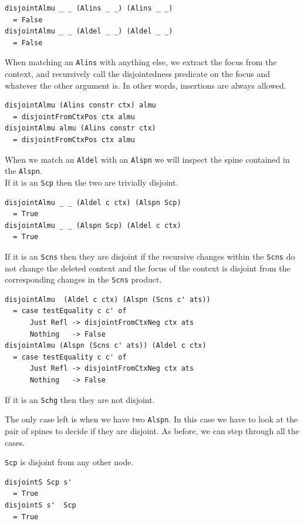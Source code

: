 \documentclass[11pt, titlepage]{article}
\newcommand{\toHaskell}[1]{\texttt{#1}\xspace}
\newcommand{\alins}{\toHaskell{Alins}}
\newcommand{\aldel}{\toHaskell{Aldel}}
\newcommand{\alspn}{\toHaskell{Alspn}}
\newcommand{\scp}{\toHaskell{Scp}}
\newcommand{\scns}{\toHaskell{Scns}}
\newcommand{\schg}{\toHaskell{Schg}}
\begin{document}
\begin{verbatim}
disjointAlmu _ _ (Alins _ _) (Alins _ _) 
  = False
disjointAlmu _ _ (Aldel _ _) (Aldel _ _)
  = False
\end{verbatim}

When matching an \alins with anything else, we extract the focus from the context, and recursively call the disjointedness predicate on the focus and whatever the other argument is. In other words, insertions are always allowed.

\begin{verbatim}
disjointAlmu (Alins constr ctx) almu
  = disjointFromCtxPos ctx almu
disjointAlmu almu (Alins constr ctx)
  = disjointFromCtxPos ctx almu
\end{verbatim}

When we match an \aldel with an \alspn we will inspect the spine contained in the \alspn.
\\
If it is an \scp then the two are trivially disjoint.

\begin{verbatim}
disjointAlmu _ _ (Aldel c ctx) (Alspn Scp)
  = True
disjointAlmu _ _ (Alspn Scp) (Aldel c ctx)
  = True
\end{verbatim}

If it is an \scns then they are disjoint if the recursive changes within the \scns do not change the deleted context and the focus of the context is disjoint from the corresponding changes in the \scns product.

\begin{verbatim}
disjointAlmu  (Aldel c ctx) (Alspn (Scns c' ats))
  = case testEquality c c' of
      Just Refl -> disjointFromCtxNeg ctx ats
      Nothing   -> False
disjointAlmu (Alspn (Scns c' ats)) (Aldel c ctx)
  = case testEquality c c' of
      Just Refl -> disjointFromCtxNeg ctx ats
      Nothing   -> False
\end{verbatim}

If it is an \schg then they are not disjoint.

The only case left is when we have two \alspn. In this case we have to look at 
the pair of spines to decide if they are disjoint. 
As before, we can step through all the cases.

\scp is disjoint from any other node. 

\begin{verbatim}
disjointS Scp s'
  = True
disjointS s'  Scp
  = True
\end{verbatim}
\end{document}
